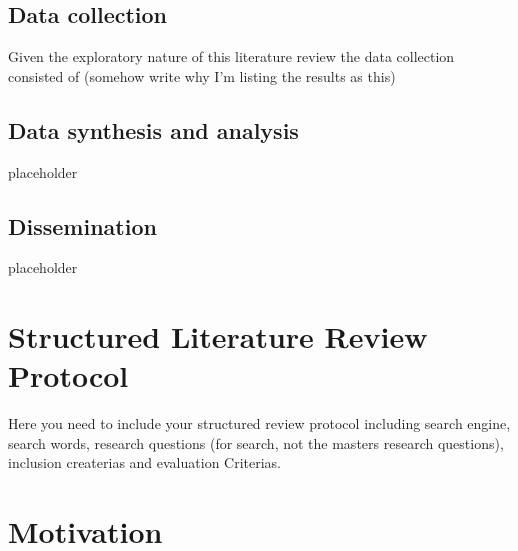 \documentclass[a4paper]{book}
\begin{document}
\subsection{Data collection}
Given the exploratory nature of this literature review the data collection consisted of (somehow write why I'm listing the results as this)



\subsection{Data synthesis and analysis}
placeholder
\subsection{Dissemination}
placeholder
\section{Structured Literature Review Protocol}
\label{sec:protocol}

Here you need to include your structured review protocol including search engine, search words, research questions  (for search, not the masters research questions), inclusion createrias and evaluation Criterias. 

\section{Motivation}
\label{sec:no2}

\end{document}

